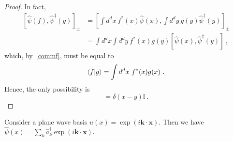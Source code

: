     \begin{proof}
        In fact,
        \begin{equation*}
        \begin{aligned}
            [\hat \psi (f), \hat \psi^\dagger (g)]_\pm & = [\int d^d x ~ f^* (x) \hat \psi(x), \int d^d y ~ g(y) \hat \psi^\dagger (y)]_\pm \\ & = \int d^d x \int d^d y ~ f^*(x) g(y) [\hat \psi(x), \hat \psi^\dagger (y)]  ~,
        \end{aligned}
        \end{equation*}
        which, by~\eqref{commf}, must be equal to 
        \begin{equation*}
            \langle f\vert g\rangle = \int d^d x ~ f^* (x) g(x) ~.
        \end{equation*}
        Hence, the only possibility is
        \begin{equation*}
            [\hat \psi(x), \hat \psi^\dagger (y)] = \delta (x - y) \mathbb I ~.
        \end{equation*}
    \end{proof}

    \begin{example}
        Consider a plane wave basis $u(x) = \exp (i \mathbf k \cdot \mathbf x) $. Then we have $\hat \psi(x) = \sum_k \hat a_k^\dagger \exp(i \mathbf k \cdot \mathbf x)$.
    \end{example}

